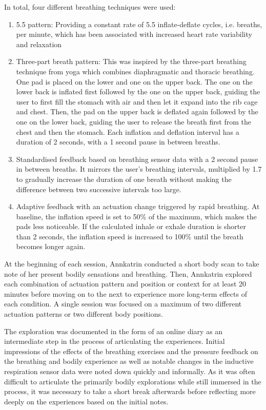 In total, four different breathing techniques were used: 
\begin{enumerate}
    \item 5.5 pattern: Providing a constant rate of 5.5 inflate-deflate cycles, i.e. breaths, per minute, which has been associated with increased heart rate variability and relaxation \cite{lin_breathing_2014} 
    \item Three-part breath pattern: This was inspired by the three-part breathing technique from yoga \cite{sengupta_dirga} which combines diaphragmatic and thoracic breathing. One pad is placed on the lower and one on the upper back. The one on the lower back is inflated first followed by the one on the upper back, guiding the user to first fill the stomach with air and then let it expand into the rib cage and chest. Then, the pad on the upper back is deflated again followed by the one on the lower back, guiding the user to release the breath first from the chest and then the stomach. Each inflation and deflation interval has a duration of 2 seconds, with a 1 second pause in between breaths. 
    \item Standardised feedback based on breathing sensor data with a 2 second pause in between breaths. It mirrors the user’s breathing intervals, multiplied by 1.7 to gradually increase the duration of one breath without making the difference between two successive intervals too large.
    \item Adaptive feedback with an actuation change triggered by rapid breathing. At baseline, the inflation speed is set to 50\% of the maximum, which makes the pads less noticeable. If the calculated inhale or exhale duration is shorter than 2 seconds, the inflation speed is increased to 100\% until the breath becomes longer again.
\end{enumerate}

At the beginning of each session, Annkatrin conducted a short body scan to take note of her present bodily sensations and breathing. Then, Annkatrin explored each combination of actuation pattern and position or context for at least 20 minutes before moving on to the next to experience more long-term effects of each condition. A single session was focused on a maximum of two different actuation patterns or two different body positions.

The exploration was documented in the form of an online diary as an intermediate step in the process of articulating the experiences. Initial impressions of the effects of the breathing exercises and the pressure feedback on the breathing and bodily experience as well as notable changes in the inductive respiration sensor data were noted down quickly and informally. As it was often difficult to articulate the primarily bodily explorations while still immersed in the process, it was necessary to take a short break afterwards before reflecting more deeply on the experiences based on the initial notes.

